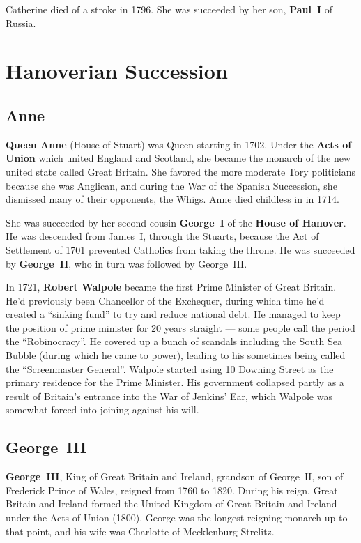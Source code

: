 Catherine died of a stroke in 1796.
She was succeeded by her son, \textbf{Paul~I} of Russia.

\section{Hanoverian Succession}

\subsection*{Anne}

\textbf{Queen Anne} (House of Stuart) was Queen starting in 1702.
Under the \textbf{Acts of Union} which united England and Scotland,
she became the monarch of the new united state called Great Britain.
She favored the more moderate Tory politicians because she was Anglican,
and during the War of the Spanish Succession, she dismissed many of their opponents, the Whigs.
Anne died childless in in 1714.

She was succeeded by her second cousin \textbf{George~I} of the \textbf{House of Hanover}.
He was descended from James~I, through the Stuarts,
because the Act of Settlement of 1701 prevented Catholics from taking the throne.
He was succeeded by \textbf{George~II}, who in turn was followed by George~III\@.

In 1721, \textbf{Robert Walpole} became the first Prime Minister of Great Britain.
He'd previously been Chancellor of the Exchequer,
during which time he'd created a ``sinking fund'' to try and reduce national debt.
He managed to keep the position of prime minister for 20 years straight ---
some people call the period the ``Robinocracy''.
He covered up a bunch of scandals including the South Sea Bubble (during which he came to power),
leading to his sometimes being called the ``Screenmaster General''.
Walpole started using 10 Downing Street as the primary residence for the Prime Minister.
His government collapsed partly as a result of Britain's entrance into the War of Jenkins' Ear,
which Walpole was somewhat forced into joining against his will.

\subsection*{George~III}

\textbf{George~III}, King of Great Britain and Ireland, grandson of George~II,
son of Frederick Prince of Wales,
reigned from 1760 to 1820.
During his reign, Great Britain and Ireland formed the United Kingdom of Great Britain and Ireland
under the Acts of Union (1800).
George was the longest reigning monarch up to that point,
and his wife was Charlotte of Mecklenburg-Strelitz.

